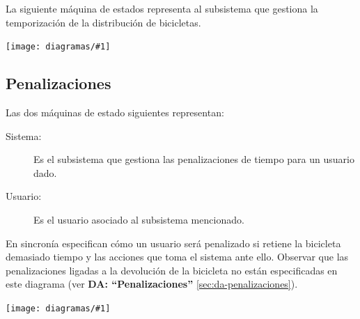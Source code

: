 \documentclass[a4paper, 10pt, twoside]{article}
\newcommand{\diagramav}[1]{%
  \texttt{[image: diagramas/\#1]}%
}
\begin{document}
La siguiente máquina de estados representa al subsistema que gestiona la temporización de la distribución de bicicletas.

\diagramav{fsm-distribucion-de-bicicletas}


\subsection{Penalizaciones}
\label{fsm:penalizaciones}

Las dos máquinas de estado siguientes representan:
\begin{description}
 \item[Sistema:] Es el subsistema que gestiona las penalizaciones de tiempo para un usuario dado.
 \item[Usuario:] Es el usuario asociado al subsistema mencionado.
\end{description}
En sincronía especifican cómo un usuario será penalizado si retiene la bicicleta demasiado tiempo y las acciones que toma el sistema ante ello. Observar que las penalizaciones ligadas a la devolución de la bicicleta no están especificadas en este diagrama (ver {\bf DA: ``Penalizaciones''} \ref{sec:da-penalizaciones}).

\diagramav{fsm-penalizaciones}
\end{document}
